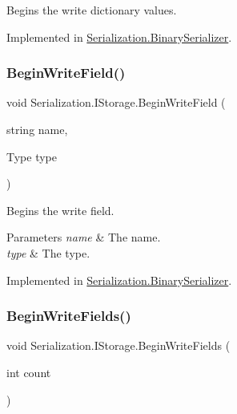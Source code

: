 Begins the write dictionary values. 



Implemented in \hyperlink{class_serialization_1_1_binary_serializer_af0bf198e95f7bac8d27a41d4dbf9a7ce}{Serialization.\+Binary\+Serializer}.

\mbox{\label{interface_serialization_1_1_i_storage_a70f3334f87463abfe43c5d256c2486fe}} 
\subsubsection{\texorpdfstring{Begin\+Write\+Field()}{BeginWriteField()}}
{\footnotesize\ttfamily void Serialization.\+I\+Storage.\+Begin\+Write\+Field (\begin{DoxyParamCaption}\item[{string}]{name,  }\item[{Type}]{type }\end{DoxyParamCaption})}



Begins the write field. 


\begin{DoxyParams}{Parameters}
{\em name} & The name.\\
\hline
{\em type} & The type.\\
\hline
\end{DoxyParams}


Implemented in \hyperlink{class_serialization_1_1_binary_serializer_a33ed72f54b3502aa05c62bf777027fde}{Serialization.\+Binary\+Serializer}.

\mbox{\label{interface_serialization_1_1_i_storage_a101b3acfd63c956c27cd9d45e2c4d7c1}} 
\subsubsection{\texorpdfstring{Begin\+Write\+Fields()}{BeginWriteFields()}}
{\footnotesize\ttfamily void Serialization.\+I\+Storage.\+Begin\+Write\+Fields (\begin{DoxyParamCaption}\item[{int}]{count }\end{DoxyParamCaption})}



